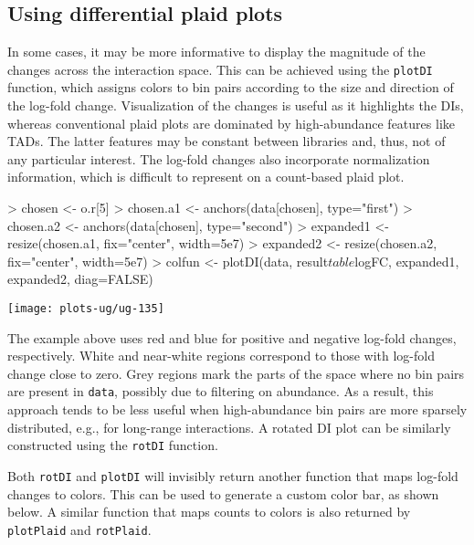 \documentclass[12pt]{report}
\renewenvironment{Schunk}{\vspace{0pt}}{\vspace{0pt}}
\newcommand{\code}[1]{{\small\texttt{#1}}}
\begin{document}
\subsection{Using differential plaid plots}
In some cases, it may be more informative to display the magnitude of the changes across the interaction space.
This can be achieved using the \code{plotDI} function, which assigns colors to bin pairs according to the size and direction of the log-fold change.
Visualization of the changes is useful as it highlights the DIs, whereas conventional plaid plots are dominated by high-abundance features like TADs.
The latter features may be constant between libraries and, thus, not of any particular interest.
The log-fold changes also incorporate normalization information, which is difficult to represent on a count-based plaid plot.

\begin{Schunk}
\begin{Sinput}
> chosen <- o.r[5]
> chosen.a1 <- anchors(data[chosen], type="first")
> chosen.a2 <- anchors(data[chosen], type="second")
> expanded1 <- resize(chosen.a1, fix="center", width=5e7)
> expanded2 <- resize(chosen.a2, fix="center", width=5e7)
> colfun <- plotDI(data, result$table$logFC, expanded1, expanded2, diag=FALSE)
\end{Sinput}
\end{Schunk}

\begin{center}
\texttt{[image: plots-ug/ug-135]}
\end{center}


The example above uses red and blue for positive and negative log-fold changes, respectively.
White and near-white regions correspond to those with log-fold change close to zero.
Grey regions mark the parts of the space where no bin pairs are present in \code{data}, possibly due to filtering on abundance.
As a result, this approach tends to be less useful when high-abundance bin pairs are more sparsely distributed, e.g., for long-range interactions.
A rotated DI plot can be similarly constructed using the \code{rotDI} function.

Both \code{rotDI} and \code{plotDI} will invisibly return another function that maps log-fold changes to colors.
This can be used to generate a custom color bar, as shown below.
A similar function that maps counts to colors is also returned by \code{plotPlaid} and \code{rotPlaid}.
\end{document}
